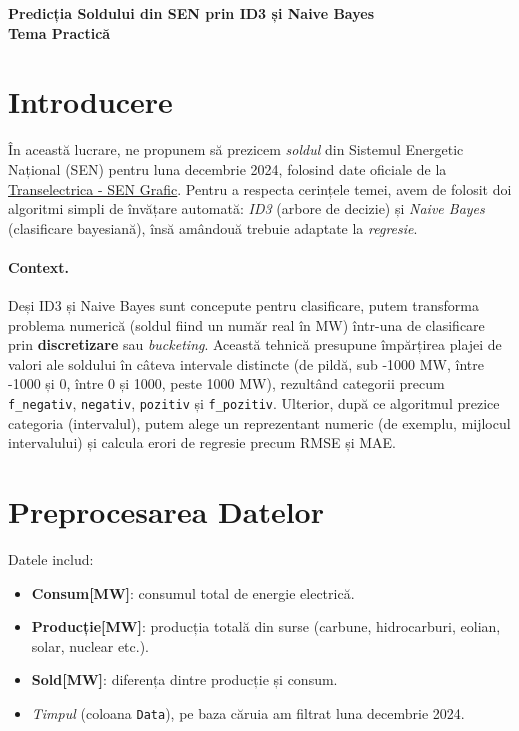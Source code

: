 \documentclass[12pt,a4paper]{article}
\begin{document}
\begin{center}
\Large \textbf{Predicția Soldului din SEN prin ID3 și Naive Bayes}\\[1em]
\large \textbf{Tema Practică}\\
\end{center}

\vspace{1em}

\section*{Introducere}

În această lucrare, ne propunem să prezicem \emph{soldul} din Sistemul Energetic Național (SEN) pentru luna decembrie 2024, folosind date oficiale de la \href{https://www.transelectrica.ro/widget/web/tel/sen-grafic/-/SENGrafic_WAR_SENGraficportlet}{Transelectrica - SEN Grafic}. Pentru a respecta cerințele temei, avem de folosit doi algoritmi simpli de învățare automată: \emph{ID3} (arbore de decizie) și \emph{Naive Bayes} (clasificare bayesiană), însă amândouă trebuie adaptate la \emph{regresie}.

\paragraph{Context.} Deși ID3 și Naive Bayes sunt concepute pentru clasificare, putem transforma problema numerică (soldul fiind un număr real în MW) într-una de clasificare prin \textbf{discretizare} sau \emph{bucketing}. Această tehnică presupune împărțirea plajei de valori ale soldului în câteva intervale distincte (de pildă, sub -1000 MW, între -1000 și 0, între 0 și 1000, peste 1000 MW), rezultând categorii precum \texttt{f\_negativ}, \texttt{negativ}, \texttt{pozitiv} și \texttt{f\_pozitiv}. Ulterior, după ce algoritmul prezice categoria (intervalul), putem alege un reprezentant numeric (de exemplu, mijlocul intervalului) și calcula erori de regresie precum RMSE și MAE.

\section*{Preprocesarea Datelor}

\noindent
Datele includ:
\begin{itemize}
\item \textbf{Consum[MW]}: consumul total de energie electrică.
\item \textbf{Producție[MW]}: producția totală din surse (carbune, hidrocarburi, eolian, solar, nuclear etc.).
\item \textbf{Sold[MW]}: diferența dintre producție și consum.
\item \emph{Timpul} (coloana \texttt{Data}), pe baza căruia am filtrat luna decembrie 2024.
\end{itemize}
\end{document}

